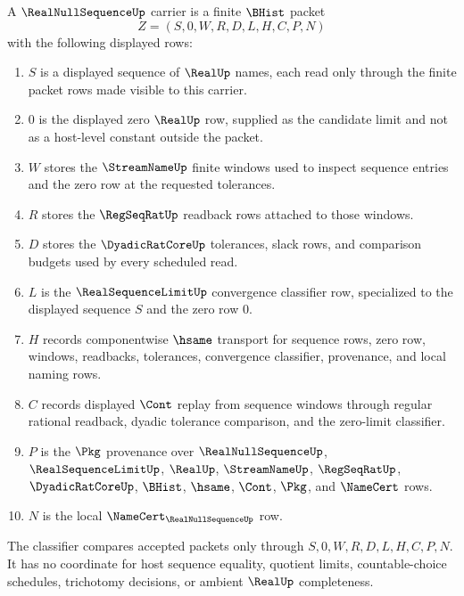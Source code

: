 \begin{definition}
\label{def:real-null-sequence-carrier}
A $\RealNullSequenceUp$ carrier is a finite $\BHist$ packet
$$
Z=(S,0,W,R,D,L,H,C,P,N)
$$
with the following displayed rows:
\begin{enumerate}
\item $S$ is a displayed sequence of $\RealUp$ names, each read only through the finite packet rows made visible to this carrier.
\item $0$ is the displayed zero $\RealUp$ row, supplied as the candidate limit and not as a host-level constant outside the packet.
\item $W$ stores the $\StreamNameUp$ finite windows used to inspect sequence entries and the zero row at the requested tolerances.
\item $R$ stores the $\RegSeqRatUp$ readback rows attached to those windows.
\item $D$ stores the $\DyadicRatCoreUp$ tolerances, slack rows, and comparison budgets used by every scheduled read.
\item $L$ is the $\RealSequenceLimitUp$ convergence classifier row, specialized to the displayed sequence $S$ and the zero row $0$.
\item $H$ records componentwise $\hsame$ transport for sequence rows, zero row, windows, readbacks, tolerances, convergence classifier, provenance, and local naming rows.
\item $C$ records displayed $\Cont$ replay from sequence windows through regular rational readback, dyadic tolerance comparison, and the zero-limit classifier.
\item $P$ is the $\Pkg$ provenance over $\RealNullSequenceUp$, $\RealSequenceLimitUp$, $\RealUp$, $\StreamNameUp$, $\RegSeqRatUp$, $\DyadicRatCoreUp$, $\BHist$, $\hsame$, $\Cont$, $\Pkg$, and $\NameCert$ rows.
\item $N$ is the local $\NameCert_{\RealNullSequenceUp}$ row.
\end{enumerate}
The classifier compares accepted packets only through $S,0,W,R,D,L,H,C,P,N$. It has no coordinate for host sequence equality, quotient limits, countable-choice schedules, trichotomy decisions, or ambient $\RealUp$ completeness.
\end{definition}

